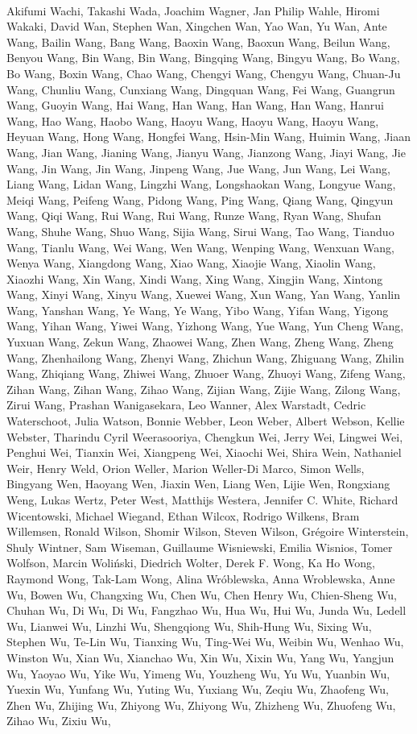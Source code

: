 \paragraph{}Akifumi Wachi, Takashi Wada, Joachim Wagner, Jan Philip Wahle, Hiromi Wakaki, David Wan, Stephen Wan, Xingchen Wan, Yao Wan, Yu Wan, Ante Wang, Bailin Wang, Bang Wang, Baoxin Wang, Baoxun Wang, Beilun Wang, Benyou Wang, Bin Wang, Bin Wang, Bingqing Wang, Bingyu Wang, Bo Wang, Bo Wang, Boxin Wang, Chao Wang, Chengyi Wang, Chengyu Wang, Chuan-Ju Wang, Chunliu Wang, Cunxiang Wang, Dingquan Wang, Fei Wang, Guangrun Wang, Guoyin Wang, Hai Wang, Han Wang, Han Wang, Han Wang, Hanrui Wang, Hao Wang, Haobo Wang, Haoyu Wang, Haoyu Wang, Haoyu Wang, Heyuan Wang, Hong Wang, Hongfei Wang, Hsin-Min Wang, Huimin Wang, Jiaan Wang, Jian Wang, Jianing Wang, Jianyu Wang, Jianzong Wang, Jiayi Wang, Jie Wang, Jin Wang, Jin Wang, Jinpeng Wang, Jue Wang, Jun Wang, Lei Wang, Liang Wang, Lidan Wang, Lingzhi Wang, Longshaokan Wang, Longyue Wang, Meiqi Wang, Peifeng Wang, Pidong Wang, Ping Wang, Qiang Wang, Qingyun Wang, Qiqi Wang, Rui Wang, Rui Wang, Runze Wang, Ryan Wang, Shufan Wang, Shuhe Wang, Shuo Wang, Sijia Wang, Sirui Wang, Tao Wang, Tianduo Wang, Tianlu Wang, Wei Wang, Wen Wang, Wenping Wang, Wenxuan Wang, Wenya Wang, Xiangdong Wang, Xiao Wang, Xiaojie Wang, Xiaolin Wang, Xiaozhi Wang, Xin Wang, Xindi Wang, Xing Wang, Xingjin Wang, Xintong Wang, Xinyi Wang, Xinyu Wang, Xuewei Wang, Xun Wang, Yan Wang, Yanlin Wang, Yanshan Wang, Ye Wang, Ye Wang, Yibo Wang, Yifan Wang, Yigong Wang, Yihan Wang, Yiwei Wang, Yizhong Wang, Yue Wang, Yun Cheng Wang, Yuxuan Wang, Zekun Wang, Zhaowei Wang, Zhen Wang, Zheng Wang, Zheng Wang, Zhenhailong Wang, Zhenyi Wang, Zhichun Wang, Zhiguang Wang, Zhilin Wang, Zhiqiang Wang, Zhiwei Wang, Zhuoer Wang, Zhuoyi Wang, Zifeng Wang, Zihan Wang, Zihan Wang, Zihao Wang, Zijian Wang, Zijie Wang, Zilong Wang, Zirui Wang, Prashan Wanigasekara, Leo Wanner, Alex Warstadt, Cedric Waterschoot, Julia Watson, Bonnie Webber, Leon Weber, Albert Webson, Kellie Webster, Tharindu Cyril Weerasooriya, Chengkun Wei, Jerry Wei, Lingwei Wei, Penghui Wei, Tianxin Wei, Xiangpeng Wei, Xiaochi Wei, Shira Wein, Nathaniel Weir, Henry Weld, Orion Weller, Marion Weller-Di Marco, Simon Wells, Bingyang Wen, Haoyang Wen, Jiaxin Wen, Liang Wen, Lijie Wen, Rongxiang Weng, Lukas Wertz, Peter West, Matthijs Westera, Jennifer C. White, Richard Wicentowski, Michael Wiegand, Ethan Wilcox, Rodrigo Wilkens, Bram Willemsen, Ronald Wilson, Shomir Wilson, Steven Wilson, Grégoire Winterstein, Shuly Wintner, Sam Wiseman, Guillaume Wisniewski, Emilia Wisnios, Tomer Wolfson, Marcin Woliński, Diedrich Wolter, Derek F. Wong, Ka Ho Wong, Raymond Wong, Tak-Lam Wong, Alina Wróblewska, Anna Wroblewska, Anne Wu, Bowen Wu, Changxing Wu, Chen Wu, Chen Henry Wu, Chien-Sheng Wu, Chuhan Wu, Di Wu, Di Wu, Fangzhao Wu, Hua Wu, Hui Wu, Junda Wu, Ledell Wu, Lianwei Wu, Linzhi Wu, Shengqiong Wu, Shih-Hung Wu, Sixing Wu, Stephen Wu, Te-Lin Wu, Tianxing Wu, Ting-Wei Wu, Weibin Wu, Wenhao Wu, Winston Wu, Xian Wu, Xianchao Wu, Xin Wu, Xixin Wu, Yang Wu, Yangjun Wu, Yaoyao Wu, Yike Wu, Yimeng Wu, Youzheng Wu, Yu Wu, Yuanbin Wu, Yuexin Wu, Yunfang Wu, Yuting Wu, Yuxiang Wu, Zeqiu Wu, Zhaofeng Wu, Zhen Wu, Zhijing Wu, Zhiyong Wu, Zhiyong Wu, Zhizheng Wu, Zhuofeng Wu, Zihao Wu, Zixiu Wu,
